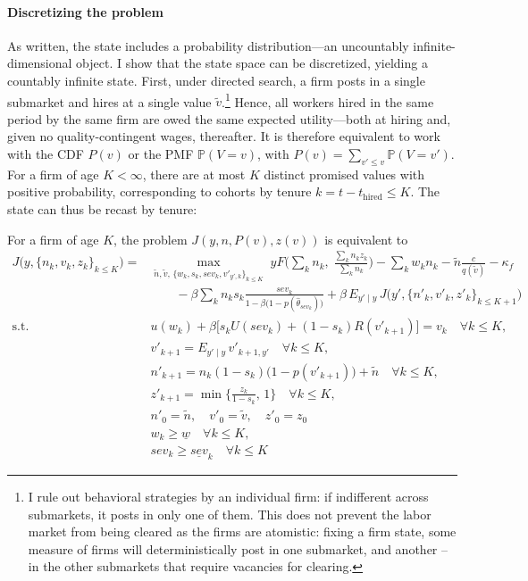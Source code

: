 \paragraph{Discretizing the problem}\label{subsection:discrete}
As written, the state includes a probability distribution—an uncountably infinite-dimensional object. I show that the state space can be discretized, yielding a countably infinite state. First, under directed search, a firm posts in a single submarket and hires at a single value $\tilde{v}$.\footnote{I rule out behavioral strategies by an individual firm: if indifferent across submarkets, it posts in only one of them. This does not prevent the labor market from being cleared as the firms are atomistic: fixing a firm state, some measure of firms will deterministically post in one submarket, and another -- in the other submarkets that require vacancies for clearing.} Hence, all workers hired in the same period by the same firm are owed the same expected utility—both at hiring and, given no quality-contingent wages, thereafter. It is therefore equivalent to work with the CDF $P(v)$ or the PMF $\mathbb{P}(V=v)$, with $P(v)=\sum_{v'\le v}\mathbb{P}(V=v')$. For a firm of age $K<\infty$, there are at most $K$ distinct promised values with positive probability, corresponding to cohorts by tenure $k=t-t_{\text{hired}}\le K$. The state can thus be recast by tenure:

\begin{lemma}\label{firmproblem}
For a firm of age $K$, the problem $J(y,n,P(v),z(v))$ is equivalent to
\begin{equation*}
\begin{split}
J\big(y,\{n_k,v_k,z_k\}_{k\le K}\big)
=& \max_{\tilde{n},\tilde{v},\,\{w_k,s_k,sev_k,v'_{y',k}\}_{k\le K}} \;
yF\!\Big(\sum_k n_k,\;\frac{\sum_k n_k z_k}{\sum_k n_k}\Big)
-\sum_k w_k n_k - \tilde{n}\frac{c}{q(\tilde{v})} - \kappa_f \\
&\qquad  - \beta\sum_{k} n_k s_k \frac{sev_k}{1-\beta\big(1-p(\hat{\theta}_{sev_k})\big)} + \beta\,E_{y'\mid y}\,J\big(y',\{n'_k,v'_k,z'_k\}_{k\le K+1}\big) \\
\text{s.t.}\qquad
& u(w_k)+\beta\big[s_k U(sev_k)+(1-s_k)R(v'_{k+1})\big]=v_k \quad \forall k\le K, \\
& v'_{k+1}=E_{y'\mid y}\,v'_{k+1,y'} \quad \forall k\le K, \\
& n'_{k+1}=n_k(1-s_k)\big(1-p(v'_{k+1})\big)+\tilde{n} \quad \forall k\le K, \\
& z'_{k+1}=\min\!\Big\{\frac{z_k}{1-s_k},\,1\Big\} \quad \forall k\le K, \\
& n'_0=\tilde{n},\quad v'_0=\tilde{v},\quad z'_0=z_0 \\
& w_k \geq \underline{w} \quad \forall k\le K,\\
& sev_k \geq \underline{sev}_k \quad \forall k\le K
\end{split}
\end{equation*}
\end{lemma}


